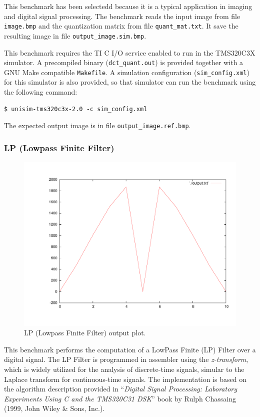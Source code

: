 This benchmark has been selectedd because it is a typical application in imaging and digital signal processing.
The benchmark reads the input image from file \texttt{image.bmp} and the quantization matrix from file \texttt{quant\_mat.txt}.
It save the resulting image in file \texttt{output\_image.sim.bmp}.

This benchmark requires the TI C I/O service enabled to run in the TMS320C3X simulator.
A precompiled binary (\texttt{dct\_quant.out}) is provided together with a GNU Make compatible \texttt{Makefile}.
A simulation configuration (\texttt{sim\_config.xml}) for this simulator is also provided, so that simulator can run the benchmark using the following command:

\begin{verbatim}
$ unisim-tms320c3x-2.0 -c sim_config.xml
\end{verbatim}

The expected output image is in file \texttt{output\_image.ref.bmp}.

\subsubsection{LP (Lowpass Finite Filter)}
\label{tms320c3x_sec:benchmarks_lp}

\begin{figure}[!h]
	\begin{center}
		\includegraphics[width=.8\textwidth]{tms320c3x/fig_lp_output.pdf}
		\caption{\label{fig:tms320c3x_manual_lp_output} LP (Lowpass Finite Filter) output plot.}
	\end{center}
\end{figure}

This benchmark performs the computation of a LowPass Finite (LP) Filter over a digital signal.
The LP Filter is programmed in assembler using the \textit{z-transform}, which is widely utilized for the analysis of discrete-time signals, simular to the Laplace transform for continuous-time signals.
The implementation is based on the algorithm description provided in ``\textit{Digital Signal Processing: Laboratory Experiments Using C and the TMS320C31 DSK}'' book by Rulph Chassaing (1999, John Wiley \& Sons, Inc.).

